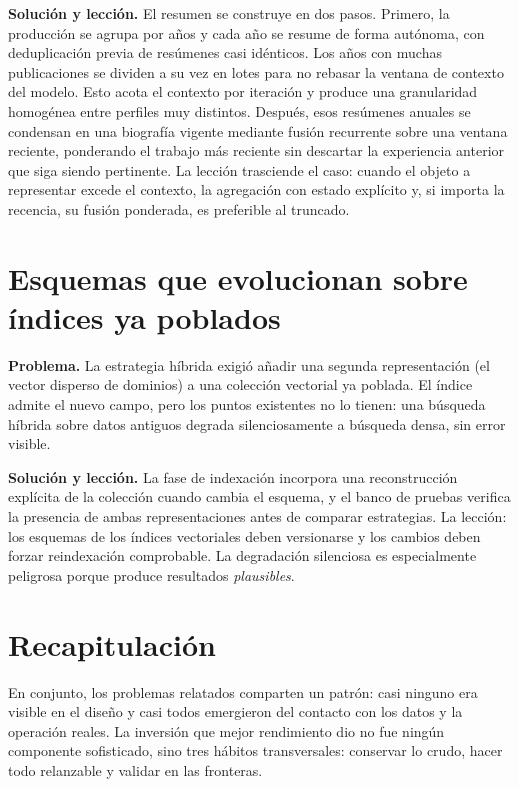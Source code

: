 \textbf{Solución y lección.}
El resumen se construye en dos pasos.
Primero, la producción se agrupa por años y cada año se resume de forma autónoma, con deduplicación previa de resúmenes casi idénticos.
Los años con muchas publicaciones se dividen a su vez en lotes para no rebasar la ventana de contexto del modelo.
Esto acota el contexto por iteración y produce una granularidad homogénea entre perfiles muy distintos.
Después, esos resúmenes anuales se condensan en una biografía vigente mediante fusión recurrente sobre una ventana reciente, ponderando el trabajo más reciente sin descartar la experiencia anterior que siga siendo pertinente.
La lección trasciende el caso: cuando el objeto a representar excede el contexto, la agregación con estado explícito y, si importa la recencia, su fusión ponderada, es preferible al truncado.

\section{Esquemas que evolucionan sobre índices ya poblados}
\label{sec:lec-esquema}

\textbf{Problema.}
La estrategia híbrida exigió añadir una segunda representación (el vector disperso de dominios) a una colección vectorial ya poblada. El índice admite el nuevo campo, pero los puntos existentes no lo tienen: una búsqueda híbrida sobre datos antiguos degrada silenciosamente a búsqueda densa, sin error visible.

\textbf{Solución y lección.}
La fase de indexación incorpora una reconstrucción explícita de la colección cuando cambia el esquema, y el banco de pruebas verifica la presencia de ambas representaciones antes de comparar estrategias.
La lección: los esquemas de los índices vectoriales deben versionarse y los cambios deben forzar reindexación comprobable.
La degradación silenciosa es especialmente peligrosa porque produce resultados \emph{plausibles}.

\section{Recapitulación}
\label{sec:lec-recap}


En conjunto, los problemas relatados comparten un patrón: casi ninguno era visible en el diseño y casi todos emergieron del contacto con los datos y la operación reales. La inversión que mejor rendimiento dio no fue ningún componente sofisticado, sino tres hábitos transversales: conservar lo crudo, hacer todo relanzable y validar en las fronteras.
